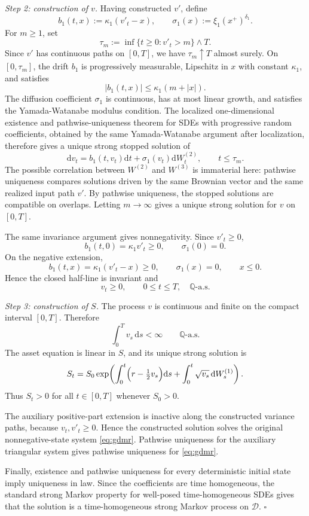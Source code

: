 \documentclass[pdflatex,sn-mathphys-num]{sn-jnl}
\theoremstyle{thmstyleone}%
\theoremstyle{thmstylethree}%
\theoremstyle{thmstyletwo}%
\newcommand{\dd}{\mathrm d}
\newcommand{\Q}{\mathbb Q}
\begin{document}
\begin{appendices}
\emph{Step 2: construction of $v$.}
Having constructed $v'$, define
$$
b_1(t,x):=\kappa_1(v'_t-x),\qquad
\sigma_1(x):=\xi_1(x^+)^{\delta_1}.
$$
For $m\ge1$, set
$$
\tau_m:=\inf\{t\ge0:v'_t>m\}\wedge T.
$$
Since $v'$ has continuous paths on $[0,T]$, we have $\tau_m\uparrow T$
almost surely. On $[0,\tau_m]$, the drift $b_1$ is progressively
measurable, Lipschitz in $x$ with constant $\kappa_1$, and satisfies
$$
|b_1(t,x)|\le\kappa_1(m+|x|).
$$
The diffusion coefficient $\sigma_1$ is continuous, has at most linear growth,
and satisfies the Yamada-Watanabe modulus condition. The localized
one-dimensional existence and pathwise-uniqueness theorem for SDEs with
progressive random coefficients, obtained by the same Yamada-Watanabe argument
after localization, therefore gives a unique strong stopped solution of
$$
\dd v_t=b_1(t,v_t)\dd t+\sigma_1(v_t)\dd W^{(2)}_t,
\qquad t\le\tau_m.
$$
The possible correlation between $W^{(2)}$ and $W^{(3)}$ is immaterial here:
pathwise uniqueness compares solutions driven by the same Brownian vector and
the same realized input path $v'$. By pathwise uniqueness, the stopped
solutions are compatible on overlaps. Letting $m\to\infty$ gives a unique
strong solution for $v$ on $[0,T]$.

The same invariance argument gives nonnegativity. Since $v'_t\ge0$,
$$
b_1(t,0)=\kappa_1v'_t\ge0,\qquad \sigma_1(0)=0.
$$
On the negative extension,
$$
b_1(t,x)=\kappa_1(v'_t-x)\ge0,\qquad
\sigma_1(x)=0,\qquad x\le0.
$$
Hence the closed half-line is invariant and
$$
v_t\ge0,\qquad 0\le t\le T,\quad \Q\text{-a.s.}
$$

\emph{Step 3: construction of $S$.}
The process $v$ is continuous and finite on the compact interval $[0,T]$.
Therefore
$$
\int_0^T v_s\,\dd s<\infty\qquad \Q\text{-a.s.}
$$
The asset equation is linear in $S$, and its unique strong solution is
$$
S_t
=S_0
\exp\!\left(
\int_0^t \Bigl(r-\tfrac12 v_s\Bigr)\dd s
+\int_0^t \sqrt{v_s}\,\dd W_s^{(1)}
\right).
$$
Thus $S_t>0$ for all $t\in[0,T]$ whenever $S_0>0$.

The auxiliary positive-part extension is inactive along the constructed variance
paths, because $v_t,v'_t\ge0$. Hence the constructed solution solves the
original nonnegative-state system \eqref{eq:gdmr}. Pathwise uniqueness for the
auxiliary triangular system gives pathwise uniqueness for \eqref{eq:gdmr}.

Finally, existence and pathwise uniqueness for every deterministic initial state
imply uniqueness in law. Since the coefficients are time homogeneous, the
standard strong Markov property for well-posed time-homogeneous SDEs gives that
the solution is a time-homogeneous strong Markov process on $\mathcal D$.
\hfill$\square$


\end{appendices}
\end{document}
